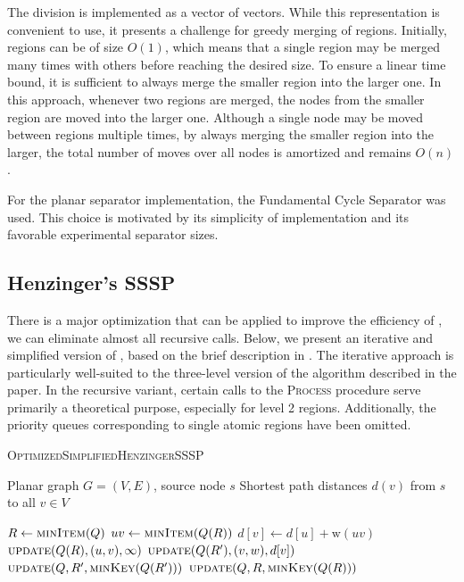 The division is implemented as a vector of vectors. While this representation is convenient to use, it presents a challenge for greedy merging of regions. Initially, regions can be of size $O(1)$, which means that a single region may be merged many times with others before reaching the desired size. To ensure a linear time bound, it is sufficient to always merge the smaller region into the larger one. In this approach, whenever two regions are merged, the nodes from the smaller region are moved into the larger one. Although a single node may be moved between regions multiple times, by always merging the smaller region into the larger, the total number of moves over all nodes is amortized and remains $O(n)$.

For the planar separator implementation, the Fundamental Cycle Separator was used. This choice is motivated by its simplicity of implementation and its favorable experimental separator sizes.

\subsection{Henzinger's SSSP}
There is a major optimization that can be applied to improve the efficiency of , we can eliminate almost all recursive calls. Below, we present an iterative and simplified version of , based on the brief description in \cite{henzinger}. The iterative approach is particularly well-suited to the three-level version of the algorithm described in the paper. In the recursive variant, certain calls to the \textsc{Process} procedure serve primarily a theoretical purpose, especially for level 2 regions. Additionally, the priority queues corresponding to single atomic regions have been omitted.

\begin{algorithm}[H]
\caption{\textsc{OptimizedSimplifiedHenzingerSSSP}}\label{henzingersimplified}
\begin{algorithmic}[1]
\Require Planar graph $G=(V,E)$, source node $s$
\Ensure Shortest path distances $d(v)$ from $s$ to all $v \in V$

    \State $R \gets \textsc{minItem}(Q)$
        \State $u v \gets \textsc{minItem}(Q(R))$
        \State $d[v] \gets d[u] + \text{w}(u v)$
        \State $\textsc{update}(Q(R), (u,v), \infty)$
            \State $\textsc{update}(Q(R'), (v,w), d[v])$
            \State $\textsc{update}(Q, R', \textsc{minKey}(Q(R')))$
            \EndIf
            \EndFor
        \EndFor
    \EndFor
    \State $\textsc{update}(Q, R, \textsc{minKey}(Q(R)))$
\EndWhile
\State {}
\end{algorithmic}
\end{algorithm}

